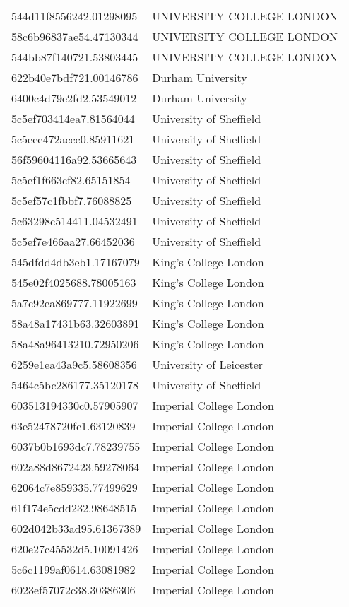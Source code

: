 \begin{tabular}{ll}
544d11f8556242.01298095 & UNIVERSITY COLLEGE LONDON \\
58c6b96837ae54.47130344 & UNIVERSITY COLLEGE LONDON \\
544bb87f140721.53803445 & UNIVERSITY COLLEGE LONDON \\
622b40e7bdf721.00146786 & Durham University \\
6400c4d79e2fd2.53549012 & Durham University \\
5c5ef703414ea7.81564044 & University of Sheffield \\
5c5eee472accc0.85911621 & University of Sheffield \\
56f59604116a92.53665643 & University of Sheffield \\
5c5ef1f663cf82.65151854 & University of Sheffield \\
5c5ef57c1fbbf7.76088825 & University of Sheffield \\
5c63298c514411.04532491 & University of Sheffield \\
5c5ef7e466aa27.66452036 & University of Sheffield \\
545dfdd4db3eb1.17167079 & King's College London \\
545e02f4025688.78005163 & King's College London \\
5a7c92ea869777.11922699 & King's College London \\
58a48a17431b63.32603891 & King's College London \\
58a48a96413210.72950206 & King's College London \\
6259e1ea43a9c5.58608356 & University of Leicester \\
5464c5bc286177.35120178 & University of Sheffield \\
603513194330c0.57905907 & Imperial College London \\
63e52478720fc1.63120839 & Imperial College London \\
6037b0b1693dc7.78239755 & Imperial College London \\
602a88d8672423.59278064 & Imperial College London \\
62064c7e859335.77499629 & Imperial College London \\
61f174e5cdd232.98648515 & Imperial College London \\
602d042b33ad95.61367389 & Imperial College London \\
620e27c45532d5.10091426 & Imperial College London \\
5c6c1199af0614.63081982 & Imperial College London \\
6023ef57072c38.30386306 & Imperial College London \\

\end{tabular}
